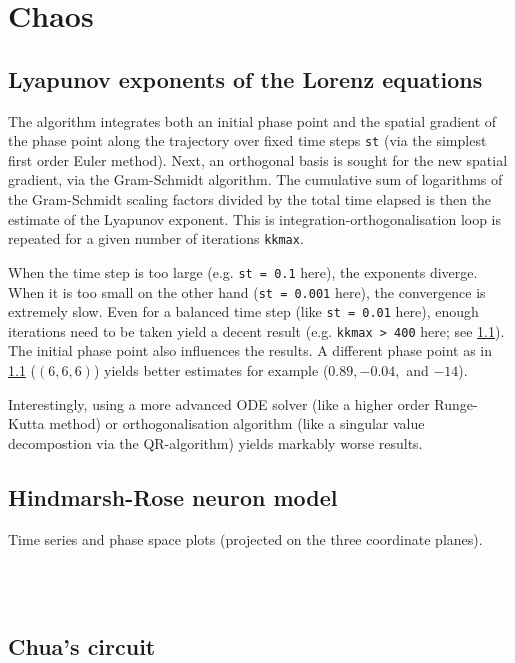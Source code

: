 \graphicspath{{../figures/5/}}


\chapter{Chaos}



\section{Lyapunov exponents of the Lorenz equations}

The algorithm integrates both an initial phase point and the spatial gradient of the phase point along the trajectory over fixed time steps \texttt{st} (via the simplest first order Euler method). Next, an orthogonal basis is sought for the new spatial gradient, via the Gram-Schmidt algorithm. The cumulative sum of logarithms of the Gram-Schmidt scaling factors divided by the total time elapsed is then the estimate of the Lyapunov exponent. This is integration-orthogonalisation loop is repeated for a given number of iterations \texttt{kkmax}.

When the time step is too large (e.g. \texttt{st = 0.1} here), the exponents diverge. When it is too small on the other hand (\texttt{st = 0.001} here), the convergence is extremely slow. Even for a balanced time step (like \texttt{st = 0.01} here), enough iterations need to be taken yield a decent result (e.g. \texttt{kkmax > 400} here; see \cref{fig:LE_Lorenz}). The initial phase point also influences the results. A different phase point as in \cref{fig:LE_Lorenz} ($(6,6,6)$) yields better estimates for example ($0.89, -0.04, $ and $-14$).

Interestingly, using a more advanced ODE solver (like a higher order Runge-Kutta method) or orthogonalisation algorithm (like a singular value decompostion via the QR-algorithm) yields markably worse results.


\begin{figure}
\label{fig:LE_Lorenz}
\end{figure}






\section{Hindmarsh-Rose neuron model}

Time series and phase space plots (projected on the three coordinate planes).

\begin{figure}
\\[4em]
\\[1em]
\label{fig:neuron}
\end{figure}




\section{Chua's circuit}


